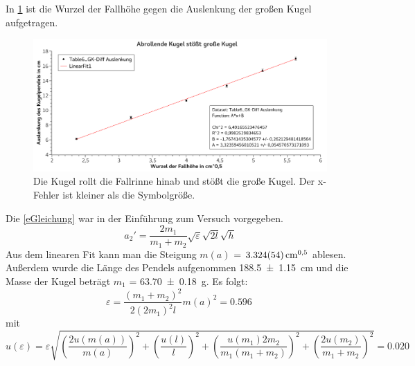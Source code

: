 \documentclass[
	a4paper,
	12pt,
	pagesize,
	ngerman
]{scrartcl}
\begin{document}
	In \cref{GraphRKaufGK} ist die Wurzel der Fallhöhe gegen die Auslenkung der großen Kugel aufgetragen. 
	\begin{figure}[htb]
	  \centering
	    \includegraphics[width=1.0\textwidth]{StossRKaufGK} 
	  \caption{Die Kugel rollt die Fallrinne hinab und stößt die große Kugel. Der x-Fehler ist kleiner als die Symbolgröße.}
		\label{GraphRKaufGK}
	\end{figure}
	Die \cref{eGleichung} war in der Einführung zum Versuch vorgegeben.
	\begin{equation}
		\label{eGleichung}
		a_2' = \frac{2m_1}{m_1+m_2} \sqrt{\varepsilon} \sqrt{2 l} \sqrt{h}
	\end{equation}
	Aus dem linearen Fit kann man die Steigung $m(a)$ = $\SI{3,324 \pm 0,054}{cm^{0,5}}$ ablesen. Außerdem wurde die Länge des Pendels aufgenommen \SI{188,5 \pm 1,15}{cm} und die Masse der Kugel beträgt $m_1$ = \SI{63,70 \pm 0,18}{g}. Es folgt:
	\begin{equation}
		\varepsilon = \frac{(m_1+m_2)^2}{2(2m_1)^2l} m(a)^2 = \SI{0,596}{} 
	\end{equation}
	mit
	\begin{equation}
		u(\varepsilon) = \varepsilon\sqrt{ \left(\frac{2u(m(a))}{m(a)}\right)^2  + \left(\frac{u(l)}{l}\right)^2 + \left(\frac{u(m_1)2m_2}{m_1 (m_1+m_2)}\right)^2 + \left(\frac{2u(m_2)}{m_1+m_2}\right)^2} = \SI{0,020}{}
	\end{equation}
\end{document}

